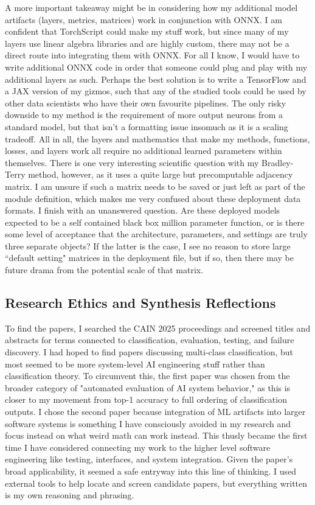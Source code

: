 \documentclass{article}
\begin{document}
A more important takeaway might be in considering how my additional model artifacts (layers, metrics, matrices) work in conjunction with ONNX. 
I am confident that TorchScript could make my stuff work, but since many of my layers use linear algebra libraries and are highly custom, there may not be a direct route into integrating them with ONNX.
For all I know, I would have to write additional ONNX code in order that someone could plug and play with my additional layers as such.
Perhaps the best solution is to write a TensorFlow and a JAX version of my gizmos, such that any of the studied tools could be used by other data scientists who have their own favourite pipelines.
The only risky downside to my method is the requirement of more output neurons from a standard model, but that isn't a formatting issue insomuch as it is a scaling tradeoff. 
All in all, the layers and mathematics that make my methods, functions, losses, and layers work all require no additional learned parameters within themselves. 
There is one very interesting scientific question with my Bradley-Terry method, however, as it uses a quite large but precomputable adjacency matrix. 
I am unsure if such a matrix needs to be saved or just left as part of the module definition, which makes me very confused about these deployment data formats. 
I finish with an unanswered question. 
Are these deployed models expected to be a self contained black box million parameter function, or is there some level of acceptance that the architecture, parameters, and settings are truly three separate objects? 
If the latter is the case, I see no reason to store large ``default setting" matrices in the deployment file, but if so, then there may be future drama from the potential scale of that matrix. 

\subsection{Research Ethics and Synthesis Reflections}

To find the papers, I searched the CAIN 2025 proceedings and screened titles and abstracts for terms connected to classification, evaluation, testing, and failure discovery. 
I had hoped to find papers discussing multi-class classification, but most seemed to be more system-level AI engineering stuff rather than classification theory. 
To circumvent this, the first paper was chosen from the broader category of "automated evaluation of AI system behavior," as this is closer to my movement from top-1 accuracy to full ordering of classification outputs. 
I chose the second paper because integration of ML artifacts into larger software systems is something I have consciously avoided in my research and focus instead on what weird math can work instead. 
This thusly became the first time I have considered connecting my work to the higher level software engineering like testing, interfaces, and system integration.
Given the paper's broad applicability, it seemed a safe entryway into this line of thinking.
I used external tools to help locate and screen candidate papers, but everything written is my own reasoning and phrasing.



\end{document}
